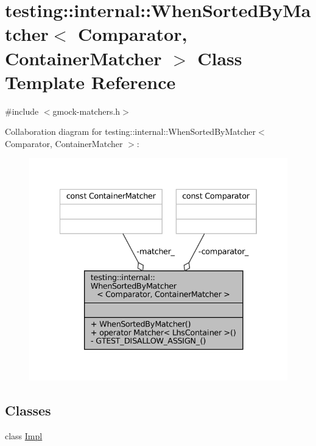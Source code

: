 \hypertarget{classtesting_1_1internal_1_1WhenSortedByMatcher}{}\section{testing\+:\+:internal\+:\+:When\+Sorted\+By\+Matcher$<$ Comparator, Container\+Matcher $>$ Class Template Reference}
\label{classtesting_1_1internal_1_1WhenSortedByMatcher}


{\ttfamily \#include $<$gmock-\/matchers.\+h$>$}



Collaboration diagram for testing\+:\+:internal\+:\+:When\+Sorted\+By\+Matcher$<$ Comparator, Container\+Matcher $>$\+:
\nopagebreak
\begin{figure}[H]
\begin{center}
\leavevmode
\includegraphics[width=334pt]{classtesting_1_1internal_1_1WhenSortedByMatcher__coll__graph}
\end{center}
\end{figure}
\subsection*{Classes}
\begin{DoxyCompactItemize}
\item 
class \hyperlink{classtesting_1_1internal_1_1WhenSortedByMatcher_1_1Impl}{Impl}
\end{DoxyCompactItemize}
